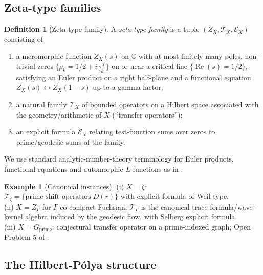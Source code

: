 \documentclass[11pt]{article}
\theoremstyle{definition}
\newtheorem{definition}[theorem]{Definition}
\newtheorem{example}[theorem]{Example}
\theoremstyle{remark}
\renewcommand{\Re}{\operatorname{Re}}
\begin{document}
\subsection{Zeta-type families}
\label{sec:zeta-family}

\begin{definition}[Zeta-type family]\label{def:zeta-family}
A \emph{zeta-type family} is a tuple $(Z_X, \mathcal{T}_X, \mathcal{E}_X)$
consisting of
\begin{enumerate}
\item a meromorphic function $Z_X(s)$ on $\mathbb{C}$ with at most
  finitely many poles, non-trivial zeros $\{\rho_k = 1/2 + i\gamma_k^X\}$
  on or near a critical line $\{\Re(s) = 1/2\}$, satisfying an Euler
  product on a right half-plane and a functional equation
  $Z_X(s) \leftrightarrow Z_X(1-s)$ up to a gamma factor;
\item a natural family $\mathcal{T}_X$ of bounded operators on a
  Hilbert space associated with the geometry/arithmetic of $X$
  (``transfer operators'');
\item an explicit formula $\mathcal{E}_X$ relating test-function
  sums over zeros to prime/geodesic sums of the family.
\end{enumerate}
\end{definition}

We use standard analytic-number-theory terminology for Euler products,
functional equations and automorphic $L$-functions as in
\cite{IwaniecKowalski}.

\begin{example}[Canonical instances]\label{ex:canonical}
(i) $X = \zeta$: $\mathcal{T}_\zeta = \{\text{prime-shift operators}
\; D(r)\}$ with explicit formula of Weil type.\\
(ii) $X = Z_\Gamma$ for $\Gamma$ co-compact Fuchsian: $\mathcal{T}_\Gamma$
is the canonical trace-formula/wave-kernel algebra induced by the
geodesic flow, with Selberg explicit formula.\\
(iii) $X = G_\mathrm{prime}$: conjectural transfer operator on a
prime-indexed graph; Open Problem 5 of \cite{Geiger2026RHIII}.
\end{example}

\subsection{The Hilbert-P\'olya structure}
\end{document}
